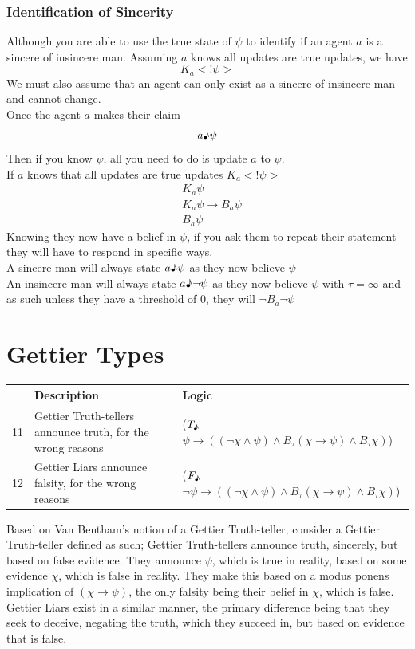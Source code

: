 \documentclass[12pt, titlepage, twoside]{report}
\newcommand{\true}{$T_\text{\textmusicalnote}$}
\newcommand{\false}{$F_\text{\textmusicalnote}$}
\begin{document}
\subsection{Identification of Sincerity}
Although you are able to use the true state of $\psi$ to identify if an agent $a$ is a sincere of insincere man. Assuming $a$ knows all updates are true updates, we have $$K_a<!\psi >$$
We must also assume that an agent can only exist as a sincere of insincere man and cannot change.\\
Once the agent $a$ makes their claim 
$$a\text{\textmusicalnote} \psi$$
Then if you know $\psi$, all you need to do is update $a$ to $\psi$.\\
If $a$ knows that all updates are true updates $K_a<!\psi >$
\begin{align*}
&K_a \psi\\
&K_a \psi \to B_a \psi\\
&B_a \psi
\end{align*}
Knowing they now have a belief in $\psi$, if you ask them to repeat their statement they will have to respond in specific ways.\\
A sincere man will always state $a\text{\textmusicalnote} \psi$ as they now believe $\psi$\\
An insincere man will always state $a\text{\textmusicalnote} \neg \psi$ as they now believe $\psi$ with $\tau = \infty$ and as such unless they have a threshold of $0$, they will $\neg B_a \neg \psi$

\chapter{Gettier Types}
\begin{table}[h]
\begin{tabular}{lp{6cm}p{8cm}}
\hline
   & Description                                                 & Logic                                                                                                               \\ \hline
11 & Gettier Truth-tellers announce truth, for the wrong reasons & (\true$\psi \to ((\neg \chi \wedge \psi ) \wedge B_\tau (\chi \to \psi ) \wedge B_\tau \chi)$)       \\
12 & Gettier Liars announce falsity, for the wrong reasons       & (\false$\neg \psi \to ((\neg \chi \wedge \psi ) \wedge B_\tau (\chi \to \psi ) \wedge B_\tau \chi)$) \\ \hline
\end{tabular}
\end{table}
Based on Van Bentham's notion of a Gettier Truth-teller\cite{BenthemJohanvan2010Mlfo}, consider a Gettier Truth-teller defined as such; Gettier Truth-tellers announce truth, sincerely, but based on false evidence. They announce $\psi$, which is true in reality, based on some evidence $\chi$, which is false in reality. They make this based on a modus ponens implication of $(\chi \to \psi)$, the only falsity being their belief in $\chi$, which is false.\\
Gettier Liars exist in a similar manner, the primary difference being that they seek to deceive, negating the truth, which they succeed in, but based on evidence that is false.
\end{document}
